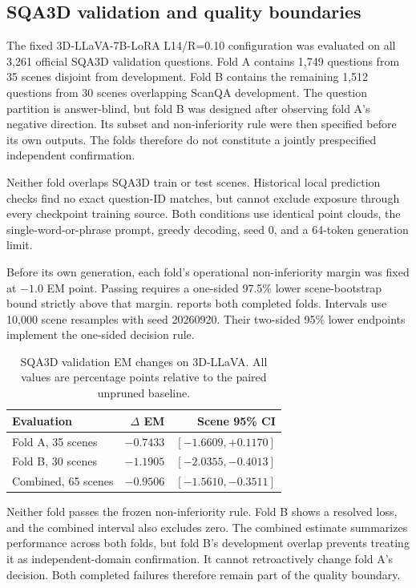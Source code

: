 \subsection{SQA3D validation and quality boundaries}
\label{sec:supp_sqa_validation}
The fixed 3D-LLaVA-7B-LoRA L14/R=0.10 configuration was evaluated on all 3,261 official SQA3D validation questions. Fold A contains 1,749 questions from 35 scenes disjoint from development. Fold B contains the remaining 1,512 questions from 30 scenes overlapping ScanQA development. The question partition is answer-blind, but fold B was designed after observing fold A's negative direction. Its subset and non-inferiority rule were then specified before its own outputs. The folds therefore do not constitute a jointly prespecified independent confirmation.

Neither fold overlaps SQA3D train or test scenes. Historical local prediction checks find no exact question-ID matches, but cannot exclude exposure through every checkpoint training source. Both conditions use identical point clouds, the single-word-or-phrase prompt, greedy decoding, seed 0, and a 64-token generation limit.

Before its own generation, each fold's operational non-inferiority margin was fixed at $-1.0$ EM point. Passing requires a one-sided 97.5\% lower scene-bootstrap bound strictly above that margin.  reports both completed folds. Intervals use 10,000 scene resamples with seed 20260920. Their two-sided 95\% lower endpoints implement the one-sided decision rule.

\begin{table}[t]
\centering
\caption{SQA3D validation EM changes on 3D-LLaVA. All values are percentage points relative to the paired unpruned baseline.}
\label{tab:sqa_validation}
\small
\begin{tabular}{lrr}
\toprule
Evaluation & $\Delta$ EM & Scene 95\% CI \\
\midrule
Fold A, 35 scenes & $-0.7433$ & $[-1.6609,+0.1170]$ \\
Fold B, 30 scenes & $-1.1905$ & $[-2.0355,-0.4013]$ \\
Combined, 65 scenes & $-0.9506$ & $[-1.5610,-0.3511]$ \\
\bottomrule
\end{tabular}
\end{table}

Neither fold passes the frozen non-inferiority rule. Fold B shows a resolved loss, and the combined interval also excludes zero. The combined estimate summarizes performance across both folds, but fold B's development overlap prevents treating it as independent-domain confirmation. It cannot retroactively change fold A's decision. Both completed failures therefore remain part of the quality boundary.

